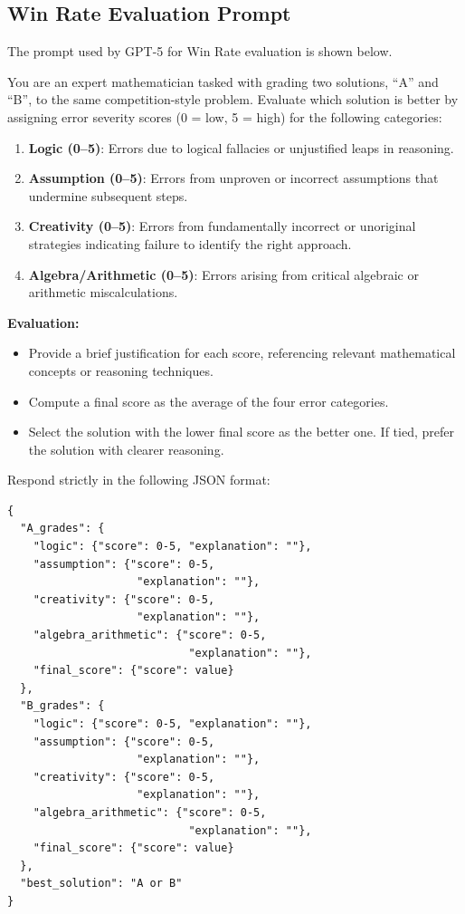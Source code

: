 \documentclass[11pt]{article}
\begin{document}
\subsection{Win Rate Evaluation Prompt}
\label{appendix:winrate_prompt}
The prompt used by GPT-5 for Win Rate evaluation is shown below.

\begin{prompt}[title={\footnotesize\texttt{Win Rate Evaluation Prompt}}, label=prompt:error_grading]
You are an expert mathematician tasked with grading two solutions, ``A'' and ``B'', to the same competition-style problem. Evaluate which solution is better by assigning error severity scores (0 = low, 5 = high) for the following categories:
\begin{enumerate}
    \item \textbf{Logic (0--5)}: Errors due to logical fallacies or unjustified leaps in reasoning.
    \item \textbf{Assumption (0--5)}: Errors from unproven or incorrect assumptions that undermine subsequent steps.
    \item \textbf{Creativity (0--5)}: Errors from fundamentally incorrect or unoriginal strategies indicating failure to identify the right approach.
    \item \textbf{Algebra/Arithmetic (0--5)}: Errors arising from critical algebraic or arithmetic miscalculations.
\end{enumerate}

\textbf{Evaluation:}
\begin{itemize}
    \item Provide a brief justification for each score, referencing relevant mathematical concepts or reasoning techniques.
    \item Compute a final score as the average of the four error categories.
    \item Select the solution with the lower final score as the better one. If tied, prefer the solution with clearer reasoning.
\end{itemize}

Respond strictly in the following JSON format:
\begin{verbatim}
{
  "A_grades": {
    "logic": {"score": 0-5, "explanation": ""},
    "assumption": {"score": 0-5, 
                    "explanation": ""},
    "creativity": {"score": 0-5, 
                    "explanation": ""},
    "algebra_arithmetic": {"score": 0-5, 
                            "explanation": ""},
    "final_score": {"score": value}
  },
  "B_grades": {
    "logic": {"score": 0-5, "explanation": ""},
    "assumption": {"score": 0-5, 
                    "explanation": ""},
    "creativity": {"score": 0-5, 
                    "explanation": ""},
    "algebra_arithmetic": {"score": 0-5, 
                            "explanation": ""},
    "final_score": {"score": value}
  },
  "best_solution": "A or B"
}
\end{verbatim}
\end{prompt}
\end{document}
